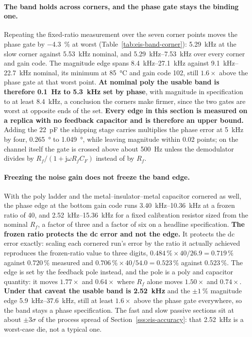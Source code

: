 \paragraph{The band holds across corners, and the phase gate stays the binding
one.} Repeating the fixed-ratio measurement over the seven corner points moves
the phase gate by \SI{-4.3}{\percent} at worst
(Table~\ref{tab:eis-band-corner}): \SI{5.29}{\kilo\hertz} at the slow corner
against \SI{5.53}{\kilo\hertz} nominal, and \SIrange{5.29}{7.53}{\kilo\hertz}
over every corner and gain code. The magnitude edge spans
\SIrange{8.4}{27.1}{\kilo\hertz} against \SIrange{9.1}{22.7}{\kilo\hertz}
nominal, its minimum at \SI{85}{\celsius} and gain code 102, still
\(1.6\times\) above the phase gate at that worst point. \textbf{At nominal poly
the usable band is therefore \SI{0.1}{\hertz} to \SI{5.3}{\kilo\hertz} set by
phase}, with magnitude in specification to at least \SI{8.4}{\kilo\hertz}, a
conclusion the corners make firmer, since the two gates are worst at opposite
ends of the set. \textbf{Every edge in this section is measured on a
replica with no feedback capacitor and is therefore an upper bound.} Adding the
\SI{22}{\pico\farad} the shipping stage carries multiplies the phase error at
\SI{5}{\kilo\hertz} by four, \SI{0.265}{\degree} to \SI{1.049}{\degree},
while leaving magnitude within \num{0.02} points; on the channel itself the
gate is crossed above about \SI{500}{\hertz} unless the demodulator divides by
\(R_f/(1 + \mathrm{j}\omega R_f C_F)\) instead of by \(R_f\).

\paragraph{Freezing the noise gain does not freeze the band edge.} With the poly
ladder and the metal--insulator--metal capacitor cornered as well, the phase
edge at the bottom gain code runs \SIrange{3.40}{10.36}{\kilo\hertz} at a frozen
ratio of \num{40}, and \SIrange{2.52}{15.36}{\kilo\hertz} for a fixed
calibration resistor sized from the nominal \(R_f\), a factor of three and a
factor of six on a headline specification. \textbf{The frozen ratio protects the
dc error and not the edge.} It protects the dc error exactly: scaling each
cornered run's error by the ratio it actually achieved reproduces the
frozen-ratio value to three digits, \(0.484\,\% \times 40/26.9 = 0.719\,\%\)
against \(0.720\,\%\) measured and \(0.706\,\% \times 40/54.0 = 0.523\,\%\)
against \(0.523\,\%\). The edge is set by the feedback pole instead, and the
pole is a poly and capacitor quantity: it moves \(1.77\times\) and
\(0.64\times\) where \(R_f\) alone moves \(1.50\times\) and \(0.74\times\).
\textbf{Under that caveat the usable band is \SI{2.52}{\kilo\hertz}} and the
\(\pm\SI{1}{\percent}\) magnitude edge \SIrange{5.9}{37.6}{\kilo\hertz}, still
at least \(1.6\times\) above the phase gate everywhere, so the band stays a
phase specification. The fast and slow passive sections sit at about
\(\pm3\sigma\) of the process spread of Section~\ref{sss:eis-accuracy}: that
\SI{2.52}{\kilo\hertz} is a worst-case die, not a typical one.

